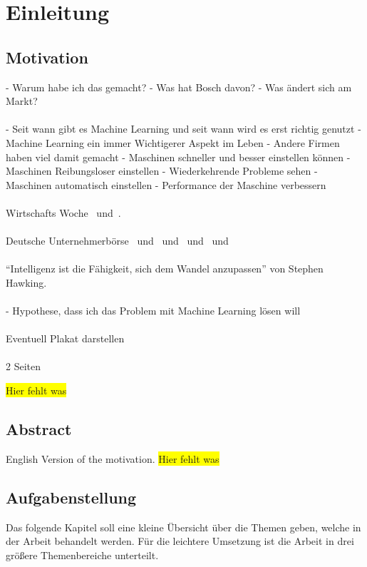 \chapter{Einleitung}
\label{ch:einleitung}

\section{Motivation}
\label{sec:motivation}
- Warum habe ich das gemacht?
- Was hat Bosch davon?
- Was ändert sich am Markt?
\\ \\
- Seit wann gibt es Machine Learning und seit wann wird es erst richtig genutzt
- Machine Learning ein immer Wichtigerer Aspekt im Leben
- Andere Firmen haben viel damit gemacht
- Maschinen schneller und besser einstellen können
- Maschinen Reibungsloser einstellen
- Wiederkehrende Probleme sehen
- Maschinen automatisch einstellen
- Performance der Maschine verbessern
\\ \\
Wirtschafts Woche~\cite{article_einleitung_ww_sg} und~\cite{article_einleitung_ww_cm}.
\\ \\
Deutsche Unternehmerbörse~\cite{article_einleitung_dub_ki} und~\cite{article_einleitung_dub_aw}
und~\cite{article_einleitung_dub_jb} und~\cite{article_einleitung_dub_sb} und~\cite{article_einleitung_dub_il}
\\ \\
\enquote{Intelligenz ist die Fähigkeit, sich dem Wandel anzupassen} von Stephen Hawking.
\\ \\
- Hypothese, dass ich das Problem mit Machine Learning lösen will
\\ \\
Eventuell Plakat darstellen
\\ \\
2 Seiten

\colorbox{yellow}{Hier fehlt was}

\newpage

\section{Abstract}
English Version of the motivation.
\colorbox{yellow}{Hier fehlt was}

\newpage

\section{Aufgabenstellung}
\label{sec:aufgabenstellung}
Das folgende Kapitel soll eine kleine Übersicht über die Themen geben, welche in der Arbeit behandelt werden. Für die
leichtere Umsetzung ist die Arbeit in drei größere Themenbereiche unterteilt.

